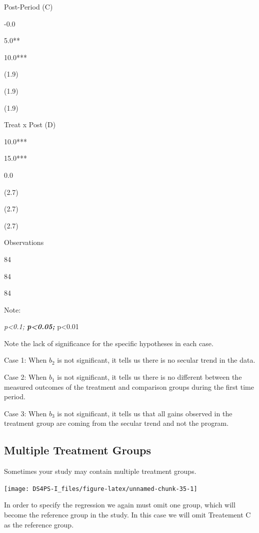 \documentclass[]{book}
\theoremstyle{definition}
\theoremstyle{definition}
\theoremstyle{definition}
\theoremstyle{remark}
\begin{document}
Post-Period (C)

-0.0

5.0**

10.0***

(1.9)

(1.9)

(1.9)

Treat x Post (D)

10.0***

15.0***

0.0

(2.7)

(2.7)

(2.7)

Observations

84

84

84

Note:

\emph{p\textless{}0.1; \textbf{p\textless{}0.05; }}p\textless{}0.01

Note the lack of significance for the specific hypotheses in each case.

Case 1: When \(b_{2}\) is not significant, it tells us there is no
secular trend in the data.

Case 2: When \(b_{1}\) is not significant, it tells us there is no
different between the measured outcomes of the treatment and comparison
groups during the first time period.

Case 3: When \(b_{3}\) is not significant, it tells us that all gains
observed in the treatment group are coming from the secular trend and
not the program.

\hypertarget{multiple-treatment-groups}{%
\subsection{Multiple Treatment Groups}\label{multiple-treatment-groups}}

Sometimes your study may contain multiple treatment groups.

\begin{center}\texttt{[image: DS4PS-I\_files/figure-latex/unnamed-chunk-35-1]} \end{center}

In order to specify the regression we again must omit one group, which
will become the reference group in the study. In this case we will omit
Treatement C as the reference group.
\end{document}

